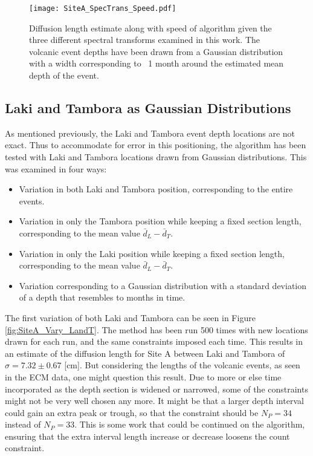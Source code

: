 \documentclass[../../CompleteThesis2/Complete_2ndDraft]{subfiles}
\begin{document}
\begin{figure}[!htb]
	\centering
	\texttt{[image: SiteA\_SpecTrans\_Speed.pdf]}
	\caption[Speed and $\sigma$ Estimates, Spectral Transforms]{\small Diffusion length estimate along with speed of algorithm given the three different spectral transforms examined in this work. The volcanic event depths have been drawn from a Gaussian distribution with a width corresponding to ~1 month around the estimated mean depth of the event.}
	\label{fig:SiteA_SpecTrans_Speed}
\end{figure}




\subsection[LT locations]{Laki and Tambora as Gaussian Distributions}
\label{Subsec:Method_TestStab_LTlocations}
As mentioned previously, the Laki and Tambora event depth locations are not exact. Thus to accommodate for error in this positioning, the algorithm has been tested with Laki and Tambora locations drawn from Gaussian distributions. This was examined in four ways:

\begin{itemize}
	\item Variation in both Laki and Tambora position, corresponding to the entire events.
	\item Variation in only the Tambora position while keeping a fixed section length, corresponding to the mean value $\bar{d}_{L}-\bar{d}_{T}$.
	\item Variation in only the Laki position while keeping a fixed section length, corresponding to the mean value $\bar{d}_{L}-\bar{d}_{T}$.
	\item Variation corresponding to a Gaussian distribution with a standard deviation of a depth that resembles to months in time.
	
\end{itemize}

The first variation of both Laki and Tambora can be seen in Figure \ref{fig:SiteA_Vary_LandT}. The method has been run 500 times with new locations drawn for each run, and the same constraints imposed each time. This results in an estimate of the diffusion length for Site A between Laki and Tambora of $\sigma=7.32\pm 0.67$ [cm]. But considering the lengths of the volcanic events, as seen in the ECM data, one might question this result. Due to more or else time incorporated as the depth section is widened or narrowed, some of the constraints might not be very well chosen any more. It might be that a larger depth interval could gain an extra peak or trough, so that the constraint should be $N_P=34$ instead of $N_P =33$. This is some work that could be continued on the algorithm, ensuring that the extra interval length increase or decrease loosens the count constraint.
\end{document}
